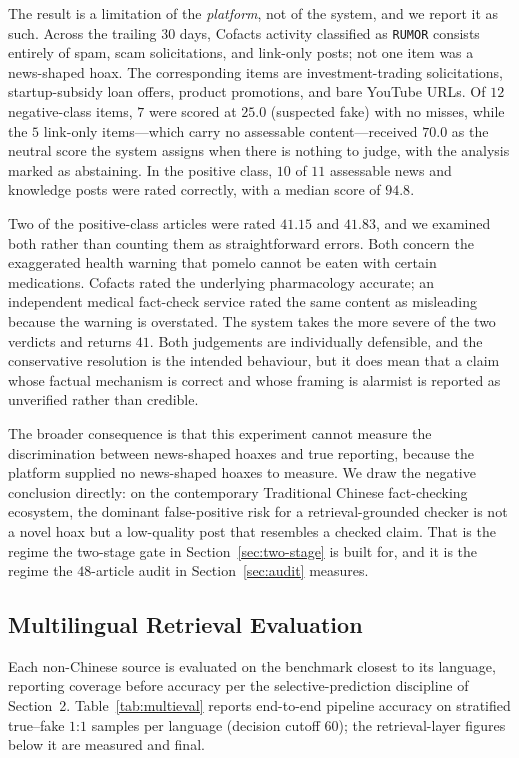 \documentclass[twoside]{llncs}
\begin{document}
The result is a limitation of the \emph{platform}, not of the system, and we report it as such. Across the trailing $30$ days, Cofacts activity classified as \texttt{RUMOR} consists entirely of spam, scam solicitations, and link-only posts; not one item was a news-shaped hoax. The corresponding items are investment-trading solicitations, startup-subsidy loan offers, product promotions, and bare YouTube URLs. Of $12$ negative-class items, $7$ were scored at $25.0$ (suspected fake) with no misses, while the $5$ link-only items---which carry no assessable content---received $70.0$ as the neutral score the system assigns when there is nothing to judge, with the analysis marked as abstaining. In the positive class, $10$ of $11$ assessable news and knowledge posts were rated correctly, with a median score of $94.8$.

Two of the positive-class articles were rated $41.15$ and $41.83$, and we examined both rather than counting them as straightforward errors. Both concern the exaggerated health warning that pomelo cannot be eaten with certain medications. Cofacts rated the underlying pharmacology accurate; an independent medical fact-check service rated the same content as misleading because the warning is overstated. The system takes the more severe of the two verdicts and returns $41$. Both judgements are individually defensible, and the conservative resolution is the intended behaviour, but it does mean that a claim whose factual mechanism is correct and whose framing is alarmist is reported as unverified rather than credible.

The broader consequence is that this experiment cannot measure the discrimination between news-shaped hoaxes and true reporting, because the platform supplied no news-shaped hoaxes to measure. We draw the negative conclusion directly: on the contemporary Traditional Chinese fact-checking ecosystem, the dominant false-positive risk for a retrieval-grounded checker is not a novel hoax but a low-quality post that resembles a checked claim. That is the regime the two-stage gate in Section~\ref{sec:two-stage} is built for, and it is the regime the $48$-article audit in Section~\ref{sec:audit} measures.

\subsection{Multilingual Retrieval Evaluation}
\label{sec:multieval}
Each non-Chinese source is evaluated on the benchmark closest to its language, reporting coverage before accuracy per the selective-prediction discipline of Section~2. Table~\ref{tab:multieval} reports end-to-end pipeline accuracy on stratified true--fake $1$:$1$ samples per language (decision cutoff $60$); the retrieval-layer figures below it are measured and final.
\end{document}
